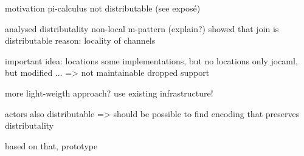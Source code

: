 motivation
pi-calculus not distributable (see exposé)

analysed distributality
  non-local m-pattern (explain?)
showed that join is distributable
reason: locality of channels

important idea: locations
some implementations, but no locations
only jocaml, but modified ...
=> not maintainable
dropped support

more light-weigth approach?
use existing infrastructure!

actors also distributable
=> should be possible to find encoding
   that preserves distributality

based on that, prototype

